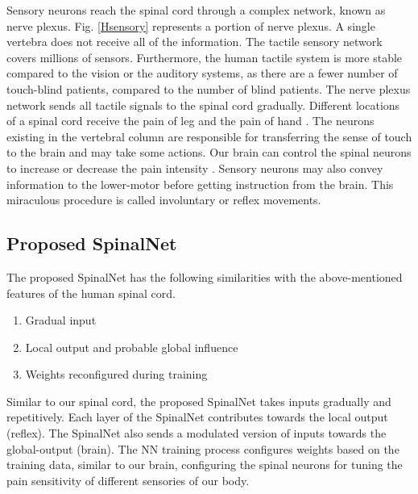 \documentclass[journal]{IEEEtran}
\begin{document}
Sensory neurons reach the spinal cord through a complex network, known as nerve plexus. Fig. \ref{Hsensory} represents a portion of nerve plexus. A single vertebra does not receive all of the information. The tactile sensory network covers millions of sensors. Furthermore, the human tactile system is more stable compared to the vision or the auditory systems, as there are a fewer number of touch-blind patients, compared to the number of blind patients. The nerve plexus network sends all tactile signals to the spinal cord gradually. Different locations of a spinal cord receive the pain of leg and the pain of hand \cite{d2008spinal}. 
The neurons existing in the vertebral column are responsible for transferring the sense of touch to the brain and may take some actions. Our brain can control the spinal neurons to increase or decrease the pain intensity \cite{sprenger2012attention}. Sensory neurons may also convey information to the lower-motor before getting instruction from the brain. This miraculous procedure is called involuntary or reflex movements.






\subsection{Proposed SpinalNet}

The proposed SpinalNet has the following similarities with the above-mentioned features of the human spinal cord.
\begin{enumerate}
    \item Gradual input 
    \item Local output and probable global influence
    \item Weights reconfigured during training
\end{enumerate}
Similar to our spinal cord, the proposed SpinalNet takes inputs gradually and repetitively. Each layer of the SpinalNet contributes towards the local output (reflex). The SpinalNet also sends a modulated version of inputs towards the global-output (brain). The NN training process configures weights based on the training data, similar to our brain, configuring the spinal neurons for tuning the pain sensitivity of different sensories of our body.
\end{document}
